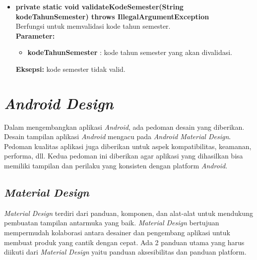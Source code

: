 \begin{itemize}
    \item \textbf{private static void validateKodeSemester(String kodeTahunSemester) throws IllegalArgumentException} \\
		Berfungsi untuk memvalidasi kode tahun semester. \\
		\textbf{Parameter:} 
		\begin{itemize}
			\item \textbf{kodeTahunSemester} : kode tahun semester yang akan divalidasi.
		\end{itemize}
		\textbf{Eksepsi:} kode semester tidak valid.
\end{itemize}

\section{\textit{Android Design}}
\label{sec:android design}
Dalam mengembangkan aplikasi \textit{Android}, ada pedoman desain yang diberikan. Desain tampilan aplikasi \textit{Android} mengacu pada \textit{Android Material Design}. Pedoman kualitas aplikasi juga diberikan untuk aspek kompatibilitas, keamanan, performa, dll. Kedua pedoman ini diberikan agar aplikasi yang dihasilkan bisa memiliki tampilan dan perilaku yang konsisten dengan platform \textit{Android}. 
 
\subsection{\textit{Material Design}}
\textit{Material Design} terdiri dari panduan, komponen, dan alat-alat untuk mendukung pembuatan tampilan antarmuka yang baik. \textit{Material Design} bertujuan mempermudah kolaborasi antara desainer dan pengembang aplikasi untuk membuat produk yang cantik dengan cepat\cite{materialdesign}. Ada 2 panduan utama yang harus diikuti dari \textit{Material Design} yaitu panduan aksesibilitas dan panduan platform. 

